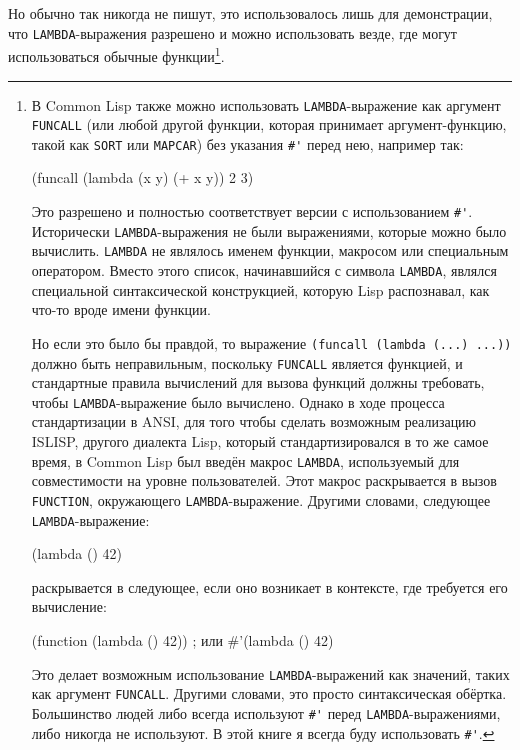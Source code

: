 Но обычно так никогда не пишут, это использовалось лишь для демонстрации, что
\lstinline{LAMBDA}-выражения разрешено и можно использовать везде, где могут использоваться
обычные функции\footnote{В Common Lisp также можно использовать
\lstinline{LAMBDA}-выражение как аргумент \lstinline{FUNCALL} (или любой другой функции, которая
принимает аргумент-функцию, такой как \lstinline{SORT} или \lstinline{MAPCAR}) без указания
\lstinline!#'! перед нею, например так:

\begin{myverb}
(funcall (lambda (x y) (+ x y)) 2 3)
\end{myverb}

Это разрешено и полностью соответствует версии с использованием \lstinline!#'!.  Исторически
\lstinline{LAMBDA}-выражения не были выражениями, которые можно было вычислить.  \lstinline{LAMBDA}
не являлось именем функции, макросом или специальным оператором.  Вместо этого список,
начинавшийся с символа \lstinline{LAMBDA}, являлся специальной синтаксической конструкцией,
которую Lisp распознавал, как что-то вроде имени функции.

Но если это было бы правдой, то выражение \lstinline{(funcall (lambda (...) ...))} должно быть
неправильным, поскольку \lstinline{FUNCALL} является функцией, и стандартные правила вычислений
для вызова функций должны требовать, чтобы \lstinline{LAMBDA}-выражение было вычислено.
Однако в ходе процесса стандартизации в ANSI, для того чтобы сделать возможным реализацию
ISLISP, другого диалекта Lisp, который стандартизировался в то же самое время, в Common
Lisp был введён макрос \lstinline{LAMBDA}, используемый для совместимости на уровне
пользователей.  Этот макрос раскрывается в вызов \lstinline{FUNCTION}, окружающего
\lstinline{LAMBDA}-выражение.  Другими словами, следующее \lstinline{LAMBDA}-выражение:

\begin{myverb}
(lambda () 42)
\end{myverb}

\noindent{}раскрывается в следующее, если оно возникает в контексте, где требуется его вычисление:

\begin{myverb}
(function (lambda () 42))   ; или #'(lambda () 42)
\end{myverb}

Это делает возможным использование \lstinline{LAMBDA}-выражений как значений, таких как
аргумент \lstinline{FUNCALL}.  Другими словами, это просто синтаксическая обёртка.  Большинство
людей либо всегда используют \lstinline!#'! перед \lstinline{LAMBDA}-выражениями, либо никогда
не используют.  В этой книге я всегда буду использовать \lstinline!#'!.}.

